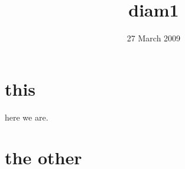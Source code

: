 \documentclass[pre,preprint]{revtex4}
\title{diam1}
\date{27 March 2009}
\begin{document}
\maketitle

\section{this}

here we are.



\section{the other}
\end{document}
